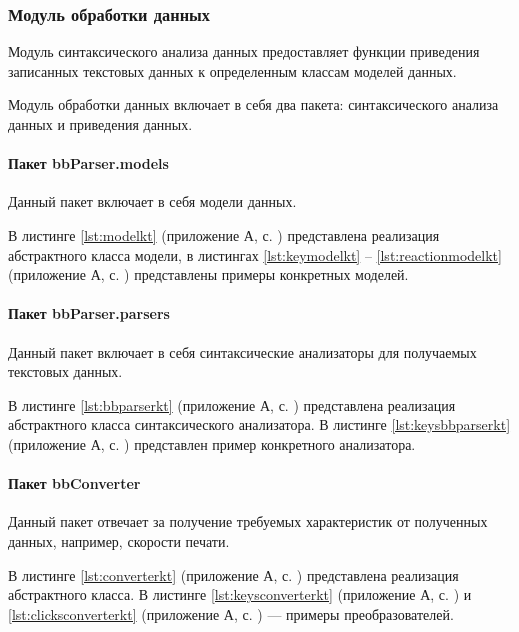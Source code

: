 \subsubsection{Модуль обработки данных}
Модуль синтаксического анализа данных предоставляет функции приведения записанных текстовых данных к определенным классам моделей данных.

Модуль обработки данных включает в себя два пакета: синтаксического анализа данных и приведения данных.

\paragraph{Пакет bbParser.models \newline}
Данный пакет включает в себя модели данных.

В листинге \ref{lst:modelkt} (приложение А, с. \pageref{chp:application-a}) представлена реализация абстрактного класса модели, в листингах \ref{lst:keymodelkt} -- \ref{lst:reactionmodelkt} (приложение А, с. \pageref{chp:application-a}) представлены примеры конкретных моделей.

\paragraph{Пакет bbParser.parsers \newline}
Данный пакет включает в себя синтаксические анализаторы для получаемых текстовых данных.

В листинге \ref{lst:bbparserkt} (приложение А, с. \pageref{chp:application-a}) представлена реализация абстрактного класса синтаксического анализатора. В листинге \ref{lst:keysbbparserkt} (приложение А, с. \pageref{chp:application-a}) представлен пример конкретного анализатора.

\paragraph{Пакет bbConverter \newline}
Данный пакет отвечает за получение требуемых характеристик от полученных данных, например, скорости печати.

В листинге \ref{lst:converterkt} (приложение А, с. \pageref{chp:application-a}) представлена реализация абстрактного класса. В листинге \ref{lst:keysconverterkt} (приложение А, с. \pageref{chp:application-a}) и \ref{lst:clicksconverterkt} (приложение А, с. \pageref{chp:application-a}) --- примеры преобразователей.

